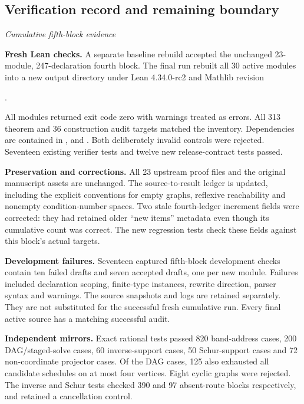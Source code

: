 \subsection{Verification record and remaining boundary}\label{supp5:subsection:007}\textit{Cumulative fifth-block evidence}\par
\textbf{Fresh Lean checks.} A separate baseline rebuild accepted the unchanged 23-module, 247-declaration fourth block. The final run rebuilt all 30 active modules into a new output directory under Lean 4.34.0-rc2 and Mathlib revision
\begin{center}.\end{center}
All modules returned exit code zero with warnings treated as errors. All 313 theorem and 36 construction audit targets matched the inventory. Dependencies are contained in ,  and . Both deliberately invalid controls were rejected. Seventeen existing verifier tests and twelve new release-contract tests passed.

\textbf{Preservation and corrections.} All 23 upstream proof files and the original manuscript assets are unchanged. The source-to-result ledger is updated, including the explicit conventions for empty graphs, reflexive reachability and nonempty condition-number spaces. Two stale fourth-ledger increment fields were corrected: they had retained older ``new items'' metadata even though its cumulative count was correct. The new regression tests check these fields against this block's actual targets.

\textbf{Development failures.} Seventeen captured fifth-block development checks contain ten failed drafts and seven accepted drafts, one per new module. Failures included declaration scoping, finite-type instances, rewrite direction, parser syntax and warnings. The source snapshots and logs are retained separately. They are not substituted for the successful fresh cumulative run. Every final active source has a matching successful audit.

\textbf{Independent mirrors.} Exact rational tests passed 820 band-address cases, 200 DAG/staged-solve cases, 60 inverse-support cases, 50 Schur-support cases and 72 non-coordinate projector cases. Of the DAG cases, 125 also exhausted all candidate schedules on at most four vertices. Eight cyclic graphs were rejected. The inverse and Schur tests checked 390 and 97 absent-route blocks respectively, and retained a cancellation control.

